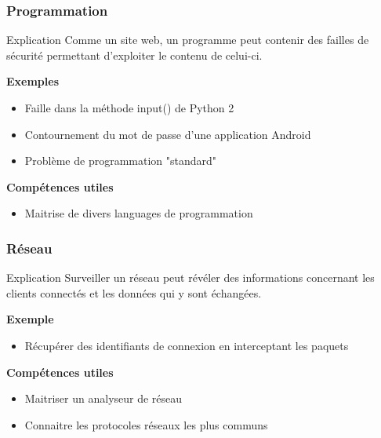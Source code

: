 \documentclass{beamer}
\begin{document}

\begin{frame}
\frametitle{Programmation}

\begin{block}{Explication}
    Comme un site web, un programme peut contenir des failles de sécurité permettant d'exploiter le contenu de celui-ci.
\end{block}

\pause

\textbf{Exemples}
\begin{itemize}
    \item Faille dans la méthode input() de Python 2
    \item Contournement du mot de passe d'une application Android
    \item Problème de programmation "standard"
\end{itemize}

\pause

\textbf{Compétences utiles}
\begin{itemize}
    \item Maitrise de divers languages de programmation
\end{itemize}


\end{frame}


\begin{frame}
\frametitle{Réseau}

\begin{block}{Explication}
    Surveiller un réseau peut révéler des informations concernant les clients connectés et les données qui y sont échangées.
\end{block}

\pause

\textbf{Exemple}
\begin{itemize}
    \item Récupérer des identifiants de connexion en interceptant les paquets
\end{itemize}

\pause

\textbf{Compétences utiles}
\begin{itemize}
    \item Maitriser un analyseur de réseau
    \item Connaitre les protocoles réseaux les plus communs
\end{itemize}


\end{frame}
\end{document}

